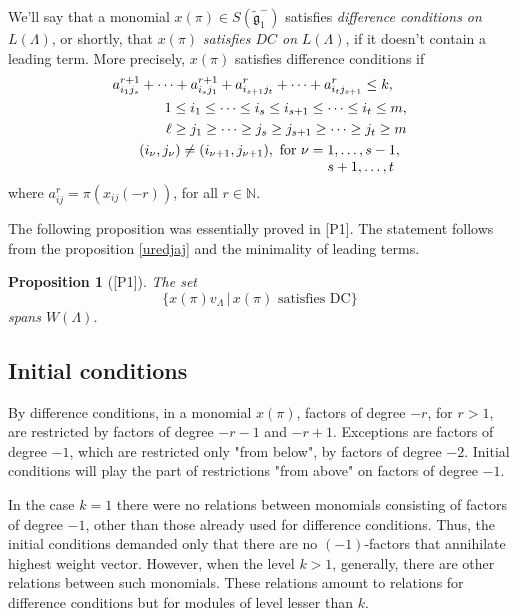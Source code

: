 \documentclass[a4paper, 10pt,oneside]{amsart}
\newtheorem{prop}[tm]{Proposition}
\begin{document}
We'll say that a monomial  $x(\pi)\in S({\tilde{{\mathfrak g}}}_1^-)$ satisfies {\em
difference conditions on} $L(\Lambda)$, or shortly, that $x(\pi)$
{\em satisfies $DC$ on} $L(\Lambda)$, if it doesn't contain a
leading term. More precisely, $x(\pi)$ satisfies difference
conditions if
\begin{eqnarray}
a_{i_1 j_s}^{r+1}+ \dots +a_{i_s j_1}^{r+1}+a_{i_{s+1} j_t}^r+ \dots
+a_{i_t j_{s+1}}^r
\leq k, & & \label{DC_eksp_jed}\\
& & \hspace{-58ex} 1\leq i_1 \leq\dots\leq i_s\leq i_{s+1} \leq\dots\leq i_t\leq m, \nonumber\\
& & \hspace{-58ex}  \ell\geq j_1 \geq\dots\geq j_s \geq j_{s+1}\geq\dots\geq j_t\geq m \nonumber\\
& & \hspace{-58ex}  (i_\nu,j_\nu)\neq (i_{\nu+1},j_{\nu+1}),\textrm{
for }
\nu=\begin{minipage}[t]{2cm}$1,\dots,s-1,$\\$s+1,\dots,t$\end{minipage} \nonumber
\end{eqnarray}
where $a_{ij}^r=\pi(x_{ij}(-r))$, for all $r\in{{\mathbb N}}$.

The following proposition was essentially proved in [P1]. The statement
follows from  the proposition \ref{uredjaj} and the minimality of leading terms. 
\begin{prop}[{[P1]}]
\label{URred_prop}
The set
\begin{equation}\{x(\pi)v_\Lambda \,|\, x(\pi)
\textrm{ satisfies DC}\}\end{equation} spans $W(\Lambda)$.
\end{prop}

\subsection{Initial conditions}

By difference conditions, in a monomial $x(\pi)$, factors of degree
$-r$, for $r>1$, are restricted by factors of degree $-r-1$ and $-r+1$.
Exceptions are factors of degree $-1$, which are restricted only
"from below", by factors of degree $-2$. Initial conditions will
play the part of restrictions "from above" on factors of degree
$-1$.

In the case $k=1$ there were no relations between monomials
consisting of factors of degree $-1$, other than those already
used for difference conditions. Thus, the initial conditions
demanded only that there are no $(-1)$-factors that annihilate
highest weight vector. However, when the level $k>1$, generally,
there are other relations between such monomials. These relations
amount to relations for difference conditions but for modules of
level lesser than $k$.
\end{document}
